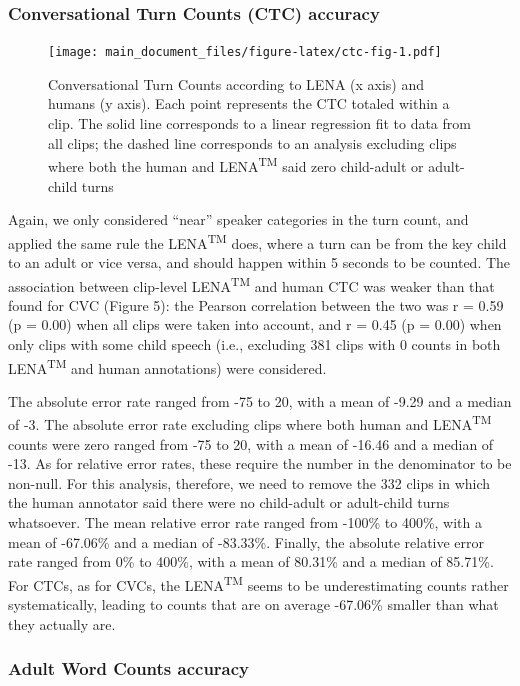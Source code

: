 \documentclass[english,floatsintext,man]{apa6}
\begin{document}
\subsubsection{Conversational Turn Counts (CTC)
accuracy}\label{conversational-turn-counts-ctc-accuracy}

\begin{figure}
\centering
\texttt{[image: main\_document\_files/figure-latex/ctc-fig-1.pdf]}
\caption{\label{fig:ctc-fig}Conversational Turn Counts according to LENA (x
axis) and humans (y axis). Each point represents the CTC totaled within
a clip. The solid line corresponds to a linear regression fit to data
from all clips; the dashed line corresponds to an analysis excluding
clips where both the human and LENA\textsuperscript{TM} said zero
child-adult or adult-child turns}
\end{figure}

Again, we only considered \enquote{near} speaker categories in the turn
count, and applied the same rule the LENA\textsuperscript{TM} does,
where a turn can be from the key child to an adult or vice versa, and
should happen within 5 seconds to be counted. The association between
clip-level LENA\textsuperscript{TM} and human CTC was weaker than that
found for CVC (Figure 5): the Pearson correlation between the two was r
= 0.59 (p = 0.00) when all clips were taken into account, and r = 0.45
(p = 0.00) when only clips with some child speech (i.e., excluding 381
clips with 0 counts in both LENA\textsuperscript{TM} and human
annotations) were considered.

The absolute error rate ranged from -75 to 20, with a mean of -9.29 and
a median of -3. The absolute error rate excluding clips where both human
and LENA\textsuperscript{TM} counts were zero ranged from -75 to 20,
with a mean of -16.46 and a median of -13. As for relative error rates,
these require the number in the denominator to be non-null. For this
analysis, therefore, we need to remove the 332 clips in which the human
annotator said there were no child-adult or adult-child turns
whatsoever. The mean relative error rate ranged from -100\% to 400\%,
with a mean of -67.06\% and a median of -83.33\%. Finally, the absolute
relative error rate ranged from 0\% to 400\%, with a mean of 80.31\% and
a median of 85.71\%. For CTCs, as for CVCs, the LENA\textsuperscript{TM}
seems to be underestimating counts rather systematically, leading to
counts that are on average -67.06\% smaller than what they actually are.

\subsubsection{Adult Word Counts
accuracy}\label{adult-word-counts-accuracy}
\end{document}
